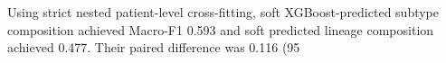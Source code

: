 Using strict nested patient-level cross-fitting, soft XGBoost-predicted subtype composition achieved Macro-F1 0.593 and soft predicted lineage composition achieved 0.477. Their paired difference was 0.116 (95%
